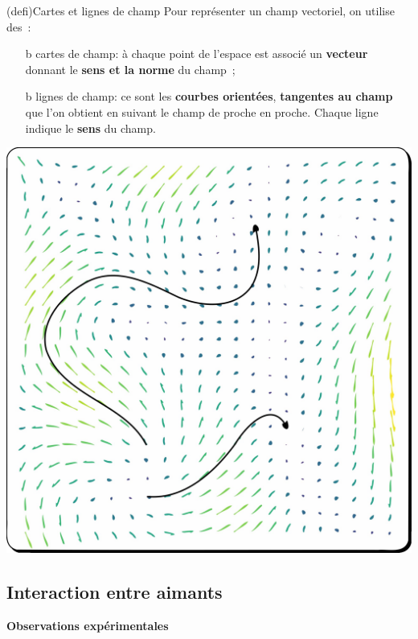 \documentclass[../../main/main.tex]{subfiles}
\begin{document}
\begin{tcb*}[sidebyside, righthand ratio=.3](defi){Cartes et lignes de champ}
	Pour représenter un champ vectoriel, on utilise des~:
	\begin{itemize}
		\item[b]{cartes de champ}: à chaque point de l'espace est associé un
		\textbf{vecteur} donnant le \textbf{sens et la norme} du champ~;

		\item[b]{lignes de champ}: ce sont les \textbf{courbes orientées},
		\textbf{tangentes au champ} que l'on
		obtient en suivant le champ de proche en proche. Chaque ligne indique le
		\textbf{sens} du champ.
	\end{itemize}
	\tcblower
	\begin{center}
		\includegraphics[width=\linewidth]{ldc_qlcq}
	\end{center}
\end{tcb*}

\subsection{Interaction entre aimants}
\textbf{Observations expérimentales}
\end{document}

